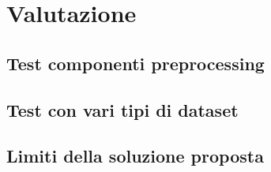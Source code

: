 \chapter{Valutazione}

\section{Test componenti preprocessing}

\section{Test con vari tipi di dataset}

\section{Limiti della soluzione proposta}
